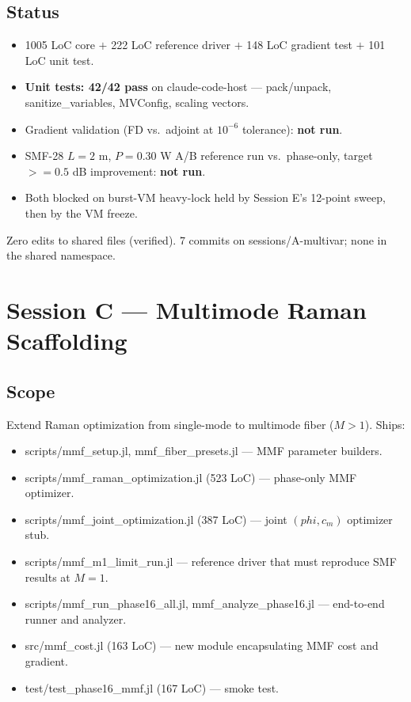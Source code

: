 \documentclass[11pt,letterpaper]{article}
\def\varphi{phi}%
\def\geq{>=}%
\def\texttt#1{#1}%
\begin{document}
\subsection{Status}

\begin{itemize}[leftmargin=*]
  \item 1005 LoC core $+$ 222 LoC reference driver $+$ 148 LoC gradient test $+$ 101 LoC unit test.
  \item \textbf{Unit tests: 42/42 pass} on \texttt{claude-code-host} --- pack/unpack, \texttt{sanitize\_variables}, \texttt{MVConfig}, scaling vectors.
  \item Gradient validation (FD vs.\ adjoint at $10^{-6}$ tolerance): \textbf{not run}.
  \item SMF-28 $L=2$ m, $P=0.30$ W A/B reference run vs.\ phase-only, target $\geq 0.5$ dB improvement: \textbf{not run}.
  \item Both blocked on burst-VM heavy-lock held by Session E's 12-point sweep, then by the VM freeze.
\end{itemize}

Zero edits to shared files (verified). 7 commits on \texttt{sessions/A-multivar}; none in the shared namespace.

\newpage
\section{Session C --- Multimode Raman Scaffolding}
\label{sec:sessionC}

\subsection{Scope}

Extend Raman optimization from single-mode to multimode fiber ($M > 1$). Ships:
\begin{itemize}[leftmargin=*]
  \item \texttt{scripts/mmf\_setup.jl}, \texttt{mmf\_fiber\_presets.jl} --- MMF parameter builders.
  \item \texttt{scripts/mmf\_raman\_optimization.jl} (523 LoC) --- phase-only MMF optimizer.
  \item \texttt{scripts/mmf\_joint\_optimization.jl} (387 LoC) --- joint $(\varphi, c_m)$ optimizer stub.
  \item \texttt{scripts/mmf\_m1\_limit\_run.jl} --- reference driver that must reproduce SMF results at $M=1$.
  \item \texttt{scripts/mmf\_run\_phase16\_all.jl}, \texttt{mmf\_analyze\_phase16.jl} --- end-to-end runner and analyzer.
  \item \texttt{src/mmf\_cost.jl} (163 LoC) --- new module encapsulating MMF cost and gradient.
  \item \texttt{test/test\_phase16\_mmf.jl} (167 LoC) --- smoke test.
\end{itemize}
\end{document}
